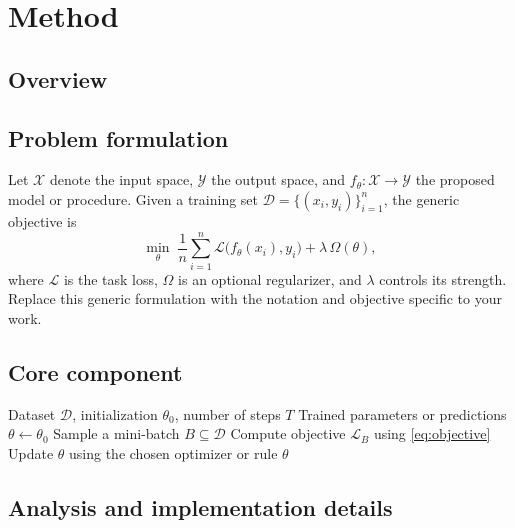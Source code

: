 \section{Method}
\label{sec:method}


\subsection{Overview}


\subsection{Problem formulation}
Let $\mathcal{X}$ denote the input space, $\mathcal{Y}$ the output space, and
$f_\theta: \mathcal{X}\to\mathcal{Y}$ the proposed model or procedure. Given a
training set $\mathcal{D}=\{(x_i,y_i)\}_{i=1}^{n}$, the generic objective is
\begin{equation}
  \min_{\theta}\; \frac{1}{n}\sum_{i=1}^{n}
  \mathcal{L}\bigl(f_\theta(x_i),y_i\bigr)+\lambda\,\Omega(\theta),
  \label{eq:objective}
\end{equation}
where $\mathcal{L}$ is the task loss, $\Omega$ is an optional regularizer, and
$\lambda$ controls its strength. Replace this generic formulation with the
notation and objective specific to your work.

\subsection{Core component}

\begin{algorithm}[t]
  \caption{Generic training or inference procedure}
  \label{alg:generic-procedure}
  \begin{algorithmic}[1]
    \Require Dataset $\mathcal{D}$, initialization $\theta_0$, number of steps $T$
    \Ensure Trained parameters or predictions
    \State $\theta \gets \theta_0$
      \State Sample a mini-batch $B\subseteq\mathcal{D}$
      \State Compute objective $\mathcal{L}_B$ using \cref{eq:objective}
      \State Update $\theta$ using the chosen optimizer or rule
    \EndFor
    \State \Return $\theta$
  \end{algorithmic}
\end{algorithm}

\subsection{Analysis and implementation details}

